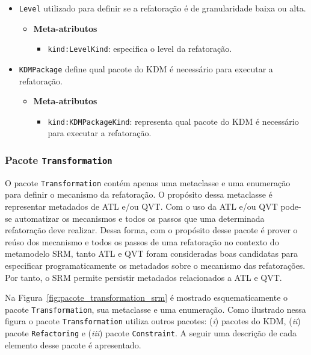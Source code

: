 \begin{itemize}
\item \texttt{Level} utilizado para definir se a refatoração é de granularidade baixa ou alta.

\begin{itemize}
	\item \textbf{Meta-atributos}
		\begin{itemize}
			\item \texttt{kind:LevelKind}: especifica o level da refatoração.
		\end{itemize}	
\end{itemize} 

\item \texttt{KDMPackage} define qual pacote do KDM é necessário para executar a refatoração.

\begin{itemize}
	\item \textbf{Meta-atributos}
		\begin{itemize}
			\item \texttt{kind:KDMPackageKind}: representa qual pacote do KDM é necessário para executar a refatoração.
		\end{itemize}	
\end{itemize} 

\end{itemize}

\subsubsection{Pacote \texttt{Transformation}}

O pacote \texttt{Transformation} contém apenas uma metaclasse e uma enumeração para definir o mecanismo da refatoração. O propósito dessa metaclasse é representar metadados de ATL e/ou QVT. Com o uso da ATL e/ou QVT pode-se automatizar os mecanismos e todos os passos que uma determinada refatoração deve realizar. Dessa forma, com o propósito desse pacote é prover o reúso dos mecanismo e todos os passos de uma refatoração no contexto do metamodelo SRM, tanto ATL e QVT foram consideradas boas candidatas para especificar programaticamente os metadados sobre o mecanismo das refatorações. Por tanto, o SRM permite persistir metadados relacionados a ATL e QVT.

Na Figura~\ref{fig:pacote_transformation_srm} é mostrado esquematicamente o pacote \texttt{Transformation}, sua metaclasse e uma enumeração. Como ilustrado nessa figura o pacote \texttt{Transformation} utiliza outros pacotes: (\textit{i}) pacotes do KDM, (\textit{ii}) pacote \texttt{Refactoring} e (\textit{iii}) pacote \texttt{Constraint}. A seguir uma descrição de cada elemento desse pacote é apresentado.

